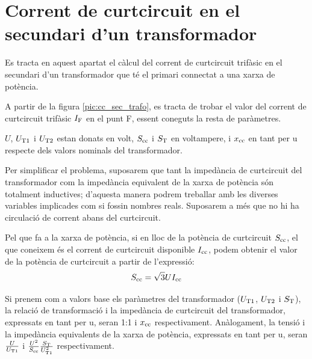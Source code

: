 \section{Corrent de curtcircuit en el  secundari d'un transformador}
\label{sec:cc-sec-trafo}

 Es tracta en aquest apartat el càlcul del corrent de curtcircuit trifàsic en el secundari d'un transformador que té el
primari connectat  a una xarxa de potència.

A partir de la figura \vref{pic:cc_sec_trafo}, es tracta de trobar
el valor del corrent de curtcircuit trifàsic $I_\mathrm{F}$ en el punt
F, essent coneguts la resta de paràmetres.

\begin{center}
    
     \label{pic:cc_sec_trafo}
\end{center}

$U$, $U_\mathrm{T1}$ i $U_\mathrm{T2}$ estan donats en volt,
$S_\mathrm{cc}$ i $S_\mathrm{T}$ en voltampere, i $x_\mathrm{cc}$ en tant per u
respecte dels valors nominals del transformador.


Per simplificar el problema, suposarem que tant la impedància
de curtcircuit del transformador com la impedància equivalent de
la xarxa de potència són totalment inductives; d'aquesta manera
podrem treballar amb les diverses variables implicades com si
fossin nombres reals. Suposarem a més que no hi ha circulació de
corrent abans del curtcircuit.

Pel que fa a la xarxa de potència, si en lloc de la potència de curtcircuit $S_\mathrm{cc}$, el que coneixem és el corrent de curtcircuit
disponible $I_\mathrm{cc}$, podem obtenir el valor de la potència de
curtcircuit a partir de l'expressió:
\begin{equation}
    S_\mathrm{cc} = \sqrt{3} U I_\mathrm{cc}
\end{equation}

 Si prenem com a valors base els
paràmetres del transformador ($U_\mathrm{T1}$, $U_\mathrm{T2}$ i
$S_\mathrm{T}$), la relació de transformació i la impedància de curtcircuit del transformador, expressats en tant per u, seran 1:1 i
$x_\mathrm{cc}$ respectivament. Anàlogament, la tensió i la impedància
equivalents de la xarxa de potència, expressats en tant per u, seran
$\frac{U}{U_\mathrm{T1}}$ i $\frac{U^2}{S_\mathrm{cc}}
\frac{S_\mathrm{T}}{U_\mathrm{T1}^2}$ respectivament.

